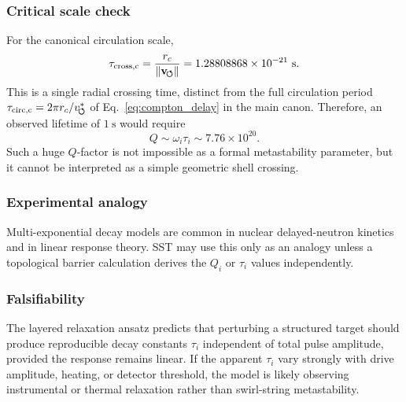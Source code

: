     \subsubsection*{Critical scale check}
        
        For the canonical circulation scale,
        \begin{equation}
            \tau_{\rm cross,c}
            =
            \frac{r_c}{\lVert\mathbf{v}_{\!\boldsymbol{\circlearrowleft}}\rVert}
            =
            1.28808868\times10^{-21}\ \mathrm{s}.
            \label{eq:core_crossing_time_numeric}
        \end{equation}
        This is a single radial crossing time, distinct from the full circulation
        period \(\tau_{\rm circ,c}=2\pi r_c/v_{\!\boldsymbol{\circlearrowleft}}^{\ast}\) of Eq.~\eqref{eq:compton_delay}
        in the main canon.
        Therefore, an observed lifetime of \(1\ \mathrm{s}\) would require
        \begin{equation}
            Q
            \sim
            \omega_i\tau_i
            \sim
            7.76\times10^{20}.
            \label{eq:large_Q_warning}
        \end{equation}
        Such a huge \(Q\)-factor is not impossible as a formal metastability parameter, but it cannot be interpreted as a simple geometric shell crossing.
    
    \subsubsection*{Experimental analogy}
        
        Multi-exponential decay models are common in nuclear delayed-neutron kinetics and in linear response theory. SST may use this only as an analogy unless a topological barrier calculation derives the \(Q_i\) or \(\tau_i\) values independently.
    
    \subsubsection*{Falsifiability}
        
        The layered relaxation ansatz predicts that perturbing a structured target should produce reproducible decay constants \(\tau_i\) independent of total pulse amplitude, provided the response remains linear. If the apparent \(\tau_i\) vary strongly with drive amplitude, heating, or detector threshold, the model is likely observing instrumental or thermal relaxation rather than swirl-string metastability.

